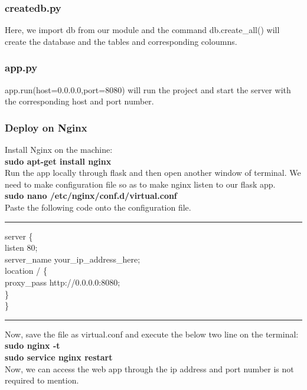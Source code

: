 \documentclass[journal,12pt,twocolumn]{IEEEtran}
\begin{document}
\subsubsection{\textbf{createdb.py}}
Here, we import db from our module and the command db.create\_all() will create the database and the tables and corresponding coloumns.

\subsubsection{\textbf{app.py}}
app.run(host=0.0.0.0,port=8080) will run the project and start the server with the corresponding host and port number.

\subsubsection{\textbf{Deploy on Nginx}}
\begin{flushleft}
Install Nginx on the machine:\\
\textbf{sudo apt-get install nginx\\}
Run the app locally through flask and then open another window of terminal. We need to make configuration file so as to make nginx listen to our flask app.\\
\textbf{sudo nano /etc/nginx/conf.d/virtual.conf\\}
Paste the following code onto the configuration file.\\
\hrule
server \{ \\
\qquad    listen       80;\\
\qquad    server\_name  your\_ip\_address\_here;\\

\qquad    location / \{ \\
\qquad \qquad        proxy\_pass http://0.0.0.0:8080;\\
\qquad    \}\\
\}
\hrule
Now, save the file as virtual.conf and execute the below two line on the terminal:\\
\textbf{sudo nginx -t\\}
\textbf{sudo service nginx restart\\}
Now, we can access the web app through the ip address and port number is not required to mention.
\end{flushleft}
\end{document}
